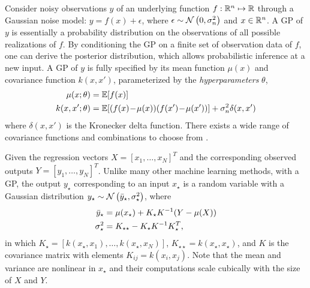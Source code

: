 Consider noisy observations \(y\) of an underlying function \(f: \mathbb{R}^n \mapsto \mathbb{R}\) through a Gaussian noise model: \(y = f(x) + \epsilon\), where \(\epsilon \sim \operatorname*{\mathcal{N}}\left(0, \sigma_n^2\right)\) and  \(x \in \mathbb{R}^n\).
A GP of $y$ is essentially a probability distribution on the observations of all possible realizations of $f$.
By conditioning the GP on a finite set of observation data of $f$, one can derive the posterior distribution, which allows probabilistic inference at a new input.
%
A GP of \(y\) is fully specified by its mean function \(\mu(x)\) and covariance function \(k(x,x')\), parameterized by the \emph{hyperparameters} \(\theta\),
\begin{align*}
\mu(x; \theta) &= \mathbb{E} [f(x)] \\
k(x,x'; \theta) &= \mathbb{E} [(f(x)\!-\!\mu(x)) (f(x') \!-\! \mu(x'))] + \sigma_n^2 \delta(x,x') \nonumber
\end{align*}
where \(\delta(x,x')\) is the Kronecker delta function.
There exists a wide range of covariance functions and combinations to choose from \cite{Rasmussen2006}.

Given the regression vectors \(X = [x_1, \dots, x_N]^T\) and the corresponding observed outputs \(Y = [y_1, \dots, y_N]^T\).
Unlike many other machine learning methods, with a GP, the output \(y_\star\) corresponding to an input \(x_\star\) is a random variable with a Gaussian distribution \(y_{\star} \sim \operatorname*{\mathcal{N}}\left(\bar{y}_\star, \sigma_\star^2\right)\), where
\begin{subequations}
\label{eq:gp-regression}
\begin{align}
\bar{y}_\star &= \mu(x_\star) + K_\star K^{-1} (Y - \mu(X))\\
\sigma_\star^2 &= K_{\star \star} - K_\star K^{-1} K_\star^T \text,
\end{align}
\end{subequations}
in which \(K_\star = [k(x_\star, x_1), \dots, k(x_\star, x_N)]\), \(K_{\star \star} = k(x_\star, x_\star)\), and $K$ is the covariance matrix with elements \(K_{ij} = k(x_i, x_j)\).
Note that the mean and variance are nonlinear in $x_{\star}$ and their computations scale cubically with the size of $X$ and $Y$.

